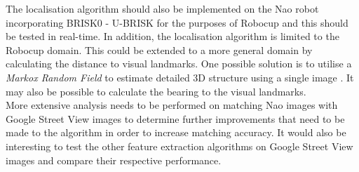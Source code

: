 The localisation algorithm should also be implemented on the Nao robot incorporating BRISK0 - U-BRISK for the purposes of Robocup and this should be tested in real-time. In addition, the localisation algorithm is limited to the Robocup domain. This could be extended to a more general domain by calculating the distance to visual landmarks. One possible solution is to utilise a \textit{Markox Random Field} to estimate detailed 3D structure using a single image \citep{Saxena}. It may also be possible to calculate the bearing to the visual landmarks. \\ 

More extensive analysis needs to be performed on matching Nao images with Google Street View images to determine further improvements that need to be made to the algorithm in order to increase matching accuracy. It would also be interesting to test the other feature extraction algorithms on Google Street View images and compare their respective performance.\\